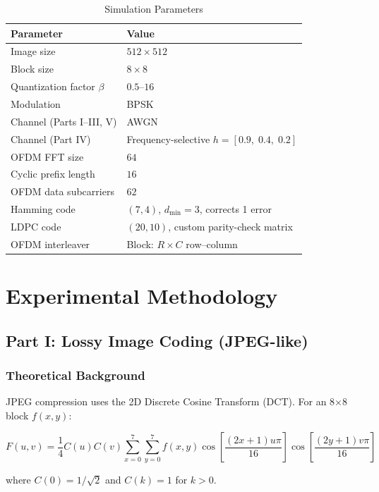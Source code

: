 \documentclass[12pt, a4paper]{article}
\begin{document}
\begin{table}[h]
\centering
\caption{Simulation Parameters}
\label{tab:params_en}
\begin{tabular}{ll}
\toprule
Parameter & Value \\
\midrule
Image size & $512\times512$ \\
Block size & $8\times8$ \\
Quantization factor $\beta$ & $0.5$--$16$ \\
Modulation & BPSK \\
Channel (Parts I--III, V) & AWGN \\
Channel (Part IV) & Frequency-selective $h=[0.9,\;0.4,\;0.2]$ \\
OFDM FFT size & $64$ \\
Cyclic prefix length & $16$ \\
OFDM data subcarriers & $62$ \\
Hamming code & $(7,4)$, $d_{\min}=3$, corrects 1 error \\
LDPC code & $(20,10)$, custom parity-check matrix \\
OFDM interleaver & Block: $R\times C$ row--column \\
\bottomrule
\end{tabular}
\end{table}

\section{Experimental Methodology}

\subsection{Part I: Lossy Image Coding (JPEG-like)}

\subsubsection{Theoretical Background}

JPEG compression uses the 2D Discrete Cosine Transform (DCT). For an 8$\times$8 block $f(x,y)$:

\begin{equation}
F(u,v)=\frac{1}{4}C(u)C(v)\sum_{x=0}^{7}\sum_{y=0}^{7}f(x,y)\cos\left[\frac{(2x+1)u\pi}{16}\right]\cos\left[\frac{(2y+1)v\pi}{16}\right]
\label{eq:dct_en}
\end{equation}

where $C(0)=1/\sqrt{2}$ and $C(k)=1$ for $k>0$.
\end{document}
